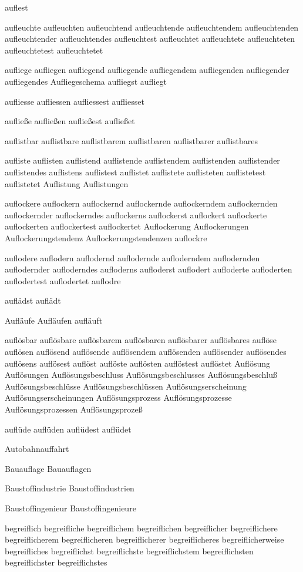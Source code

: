 auflest

aufleuchte aufleuchten aufleuchtend aufleuchtende aufleuchtendem aufleuchtenden aufleuchtender aufleuchtendes aufleuchtest aufleuchtet aufleuchtete aufleuchteten aufleuchtetest aufleuchtetet

aufliege aufliegen aufliegend aufliegende aufliegendem aufliegenden aufliegender aufliegendes Aufliegeschema aufliegst aufliegt

aufliesse aufliessen aufliessest aufliesset

aufließe aufließen aufließest aufließet

auflistbar auflistbare auflistbarem auflistbaren auflistbarer auflistbares 

aufliste auflisten auflistend auflistende auflistendem auflistenden auflistender auflistendes auflistens auflistest auflistet auflistete auflisteten auflistetest auflistetet Auflistung Auflistungen

auflockere auflockern auflockernd auflockernde auflockerndem auflockernden auflockernder auflockerndes auflockerns auflockerst auflockert auflockerte auflockerten auflockertest auflockertet Auflockerung Auflockerungen Auflockerungstendenz Auflockerungstendenzen auflockre

auflodere auflodern auflodernd auflodernde aufloderndem auflodernden auflodernder aufloderndes aufloderns aufloderst auflodert aufloderte aufloderten auflodertest auflodertet auflodre

auflädst auflädt

Aufläufe Aufläufen aufläuft

auflösbar auflösbare auflösbarem auflösbaren auflösbarer auflösbares auflöse auflösen auflösend auflösende auflösendem auflösenden auflösender auflösendes auflösens auflösest auflöst auflöste auflösten auflöstest auflöstet Auflösung Auflösungen Auflösungsbeschluss Auflösungsbeschlusses Auflösungsbeschluß Auflösungsbeschlüsse Auflösungsbeschlüssen Auflösungserscheinung Auflösungserscheinungen Auflösungsprozess Auflösungsprozesse Auflösungsprozessen Auflösungsprozeß

auflüde auflüden auflüdest auflüdet

Autobahnauffahrt

Bauauflage Bauauflagen

Baustoffindustrie Baustoffindustrien

Baustoffingenieur Baustoffingenieure

begreiflich begreifliche begreiflichem begreiflichen begreiflicher begreiflichere begreiflicherem begreiflicheren begreiflicherer begreiflicheres begreiflicherweise begreifliches begreiflichst begreiflichste begreiflichstem begreiflichsten begreiflichster begreiflichstes

